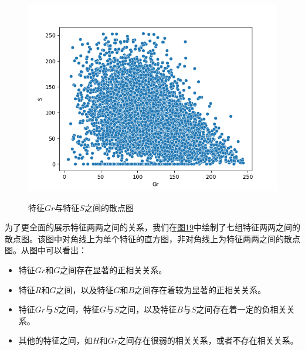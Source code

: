 \documentclass[UTF8]{ctexart}
\begin{document}
	\begin{figure}[htbp]
		\centering
		\caption{特征$Gr$与特征$S$之间的散点图}
		\includegraphics[width=1.0\textwidth]{scatter_gr_s.png}
		\label{Fig.18}
	\end{figure}

	为了更全面的展示特征两两之间的关系，我们在\hyperref[Fig.19]{图19}中绘制了七组特征两两之间的散点图。该图中对角线上为单个特征的直方图，非对角线上为特征两两之间的散点图。从图中可以看出：
	\begin{itemize}
		\item 特征$Gr$和$G$之间存在显著的正相关关系。
		\item 特征$R$和$G$之间，以及特征$G$和$B$之间存在着较为显著的正相关关系。
		\item 特征$Gr$与$S$之间，特征$G$与$S$之间，以及特征$B$与$S$之间存在着一定的负相关关系。
		\item 其他的特征之间，如$H$和$Gr$之间存在很弱的相关关系，或者不存在相关关系。
	\end{itemize} 
	
\end{document}
